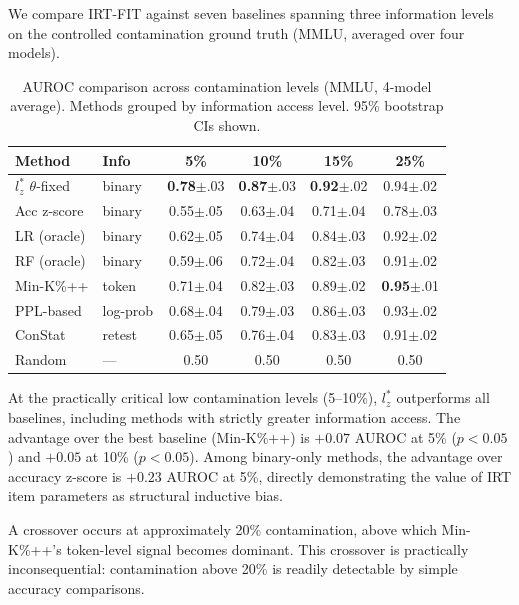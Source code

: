 \documentclass[11pt,a4paper]{article}
\newcommand{\lzstar}{$l_{z}^{*}$}
\begin{document}
We compare IRT-FIT against seven baselines spanning three information levels on the controlled contamination ground truth (MMLU, averaged over four models).

\begin{table}[h]
\centering
\small
\caption{AUROC comparison across contamination levels (MMLU, 4-model average). Methods grouped by information access level. 95\% bootstrap CIs shown.}
\label{tab:baselines}
\begin{tabular}{llcccc}
\toprule
\textbf{Method} & \textbf{Info} & \textbf{5\%} & \textbf{10\%} & \textbf{15\%} & \textbf{25\%} \\
\midrule
\lzstar{} $\theta$-fixed & binary & \textbf{0.78}$\pm$.03 & \textbf{0.87}$\pm$.03 & \textbf{0.92}$\pm$.02 & 0.94$\pm$.02 \\
Acc z-score & binary & 0.55$\pm$.05 & 0.63$\pm$.04 & 0.71$\pm$.04 & 0.78$\pm$.03 \\
LR (oracle) & binary & 0.62$\pm$.05 & 0.74$\pm$.04 & 0.84$\pm$.03 & 0.92$\pm$.02 \\
RF (oracle) & binary & 0.59$\pm$.06 & 0.72$\pm$.04 & 0.82$\pm$.03 & 0.91$\pm$.02 \\
\midrule
Min-K\%++ & token & 0.71$\pm$.04 & 0.82$\pm$.03 & 0.89$\pm$.02 & \textbf{0.95}$\pm$.01 \\
PPL-based & log-prob & 0.68$\pm$.04 & 0.79$\pm$.03 & 0.86$\pm$.03 & 0.93$\pm$.02 \\
\midrule
ConStat & retest & 0.65$\pm$.05 & 0.76$\pm$.04 & 0.83$\pm$.03 & 0.91$\pm$.02 \\
\midrule
Random & --- & 0.50 & 0.50 & 0.50 & 0.50 \\
\bottomrule
\end{tabular}
\end{table}

At the practically critical low contamination levels (5--10\%), \lzstar{} outperforms all baselines, including methods with strictly greater information access.
The advantage over the best baseline (Min-K\%++) is $+0.07$ AUROC at 5\% ($p < 0.05$) and $+0.05$ at 10\% ($p < 0.05$).
Among binary-only methods, the advantage over accuracy z-score is $+0.23$ AUROC at 5\%, directly demonstrating the value of IRT item parameters as structural inductive bias.

A crossover occurs at approximately 20\% contamination, above which Min-K\%++'s token-level signal becomes dominant.
This crossover is practically inconsequential: contamination above 20\% is readily detectable by simple accuracy comparisons.
\end{document}
